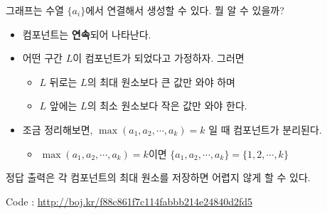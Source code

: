 \documentclass[hyperref={unicode}]{beamer}
\begin{document}
 
    \begin{frame}
         그래프는 수열 $ \{a_i\}  $에서 연결해서 생성할 수 있다. 뭘 알 수 있을까?
        \begin{itemize}
        \item<2-> 컴포넌트는 \textbf{연속}되어 나타난다.
        \item<3-> 어떤 구간 $ L $이 컴포넌트가 되었다고 가정하자. 그러면
            \begin{itemize}
            \item<4-> $ L $ 뒤로는 $ L $의 최대 원소보다 큰 값만 와야 하며
            \item<5-> $ L $ 앞에는 $ L $의 최소 원소보다 작은 값만 와야 한다.
            \end{itemize}
        \item<6-> 조금 정리해보면, $ \max(a_1, a_2, \cdots, a_k) = k$ 일 때 컴포넌트가 분리된다.
        \begin{itemize}
        \item<7-> $ \max(a_1, a_2, \cdots, a_k) = k$이면 $ \{a_1, a_2, \cdots, a_k\} = \{1, 2, \cdots, k\}$
        \end{itemize}
        \end{itemize}
         정답 출력은 각 컴포넌트의 최대 원소를 저장하면 어렵지 않게 할 수 있다.
        
    \end{frame}  
    

    \begin{frame}
        Code : \url{http://boj.kr/f88c861f7c114fabbb214e24840d2fd5}
    \end{frame}
\end{document}
